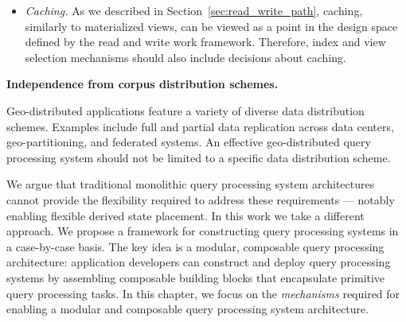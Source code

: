 \begin{itemize}
  \item \textit{Caching.}
  As we described in Section~\ref{sec:read_write_path},
  caching, similarly to materialized views, can be viewed as a point in the design space defined by the read and write
  work framework.
  Therefore, index and view selection mechanisms should also include decisions about caching.

\end{itemize}

\medskip
\noindent
\textbf{Independence from corpus distribution schemes.}

\noindent
Geo-distributed applications feature a variety of diverse data distribution schemes.
Examples include full and partial data replication across data centers, geo-partitioning, and federated systems.
An effective geo-distributed query processing system should not be limited to a specific data distribution scheme.

\bigskip
\noindent
We argue that traditional monolithic query processing system architectures cannot provide the flexibility required
to address these requirements --- notably enabling flexible derived state placement.
In this work we take a different approach.
We propose a framework for constructing query processing systems in a case-by-case basis.
The key idea is a modular, composable query processing architecture:
application developers can construct and deploy query processing systems by assembling composable building blocks that
encapsulate primitive query processing tasks.
In this chapter,
we focus on the \textit{mechanisms} required for enabling a modular and composable query processing system architecture.




